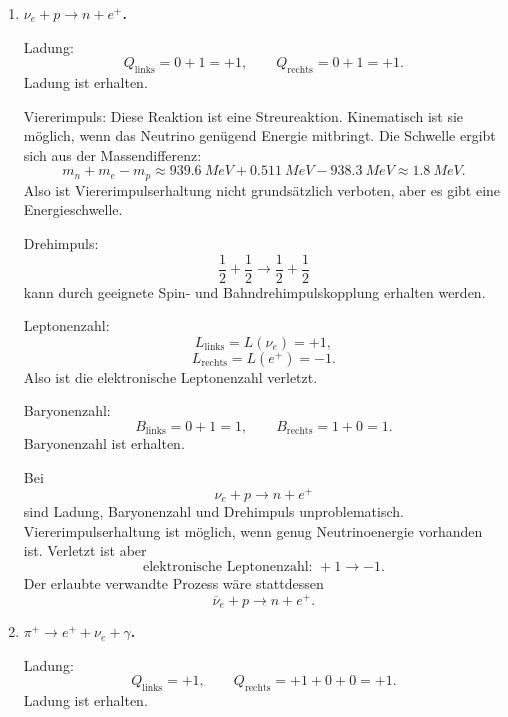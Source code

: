 \documentclass[11pt,a4paper]{scrartcl}
\theoremstyle{definition}
\theoremstyle{plain}
\theoremstyle{remark}
\begin{document}
\begin{enumerate}[label=(\alph*)]
    \item \textbf{$\nu_e+p\to n+e^+$.}

    \begin{calculationbox}
        Ladung:
        \[
            Q_{\mathrm{links}}=0+1=+1,
            \qquad
            Q_{\mathrm{rechts}}=0+1=+1.
        \]
        Ladung ist erhalten.

        Viererimpuls:
        Diese Reaktion ist eine Streureaktion. Kinematisch ist sie möglich, wenn das Neutrino genügend Energie mitbringt. Die Schwelle ergibt sich aus der Massendifferenz:
        \[
            m_n+m_e-m_p
            \approx
            \SI{939.6}{MeV}+\SI{0.511}{MeV}-\SI{938.3}{MeV}
            \approx
            \SI{1.8}{MeV}.
        \]
        Also ist Viererimpulserhaltung nicht grundsätzlich verboten, aber es gibt eine Energieschwelle.

        Drehimpuls:
        \[
            \frac12+\frac12\to\frac12+\frac12
        \]
        kann durch geeignete Spin- und Bahndrehimpulskopplung erhalten werden.

        Leptonenzahl:
        \[
            L_{\mathrm{links}}=L(\nu_e)=+1,
        \]
        \[
            L_{\mathrm{rechts}}=L(e^+)=-1.
        \]
        Also ist die elektronische Leptonenzahl verletzt.

        Baryonenzahl:
        \[
            B_{\mathrm{links}}=0+1=1,
            \qquad
            B_{\mathrm{rechts}}=1+0=1.
        \]
        Baryonenzahl ist erhalten.
    \end{calculationbox}

    \begin{answerbox}
        Bei
        \[
            \nu_e+p\to n+e^+
        \]
        sind Ladung, Baryonenzahl und Drehimpuls unproblematisch. Viererimpulserhaltung ist möglich, wenn genug Neutrinoenergie vorhanden ist. Verletzt ist aber
        \[
            \boxed{\text{elektronische Leptonenzahl: }+1\to -1.}
        \]
        Der erlaubte verwandte Prozess wäre stattdessen
        \[
            \overline{\nu}_e+p\to n+e^+.
        \]
    \end{answerbox}

    \item \textbf{$\pi^+\to e^+ + \nu_e+\gamma$.}

    \begin{calculationbox}
        Ladung:
        \[
            Q_{\mathrm{links}}=+1,
            \qquad
            Q_{\mathrm{rechts}}=+1+0+0=+1.
        \]
        Ladung ist erhalten.


\end{calculationbox}
\end{enumerate}
\end{document}
